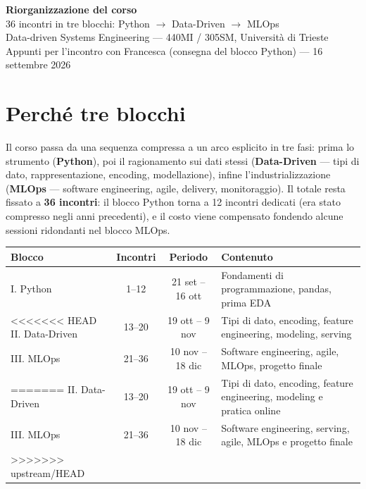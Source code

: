 \documentclass[11pt,a4paper]{article}
\begin{document}
\begin{center}
{\Huge\bfseries\color{courseblue} Riorganizzazione del corso}\\[4pt]
{\Large\color{coursegray} 36 incontri in tre blocchi: Python $\to$ Data-Driven $\to$ MLOps}\\[6pt]
{\small\color{coursegray} Data-driven Systems Engineering --- 440MI / 305SM, Università di Trieste}\\
{\small\color{coursegray} Appunti per l'incontro con Francesca (consegna del blocco Python) --- 16 settembre 2026}
\end{center}

\vspace{0.6em}

\section*{Perché tre blocchi}
Il corso passa da una sequenza compressa a un arco esplicito in tre fasi: prima lo strumento (\textbf{Python}), poi il ragionamento sui dati stessi (\textbf{Data-Driven} --- tipi di dato, rappresentazione, encoding, modellazione), infine l'industrializzazione (\textbf{MLOps} --- software engineering, agile, delivery, monitoraggio). Il totale resta fissato a \textbf{36 incontri}: il blocco Python torna a 12 incontri dedicati (era stato compresso negli anni precedenti), e il costo viene compensato fondendo alcune sessioni ridondanti nel blocco MLOps.

\vspace{0.3em}
\begin{center}
\begin{tabularx}{\textwidth}{@{}l c c X@{}}
\toprule
\textbf{Blocco} & \textbf{Incontri} & \textbf{Periodo} & \textbf{Contenuto} \\
\midrule
\rowcolor{tealsoft} I. Python & 1--12 & 21 set -- 16 ott & Fondamenti di programmazione, pandas, prima EDA \\
<<<<<<< HEAD
\rowcolor{courseice} II. Data-Driven & 13--20 & 19 ott -- 9 nov & Tipi di dato, encoding, feature engineering, modeling, serving \\
\rowcolor{plumsoft} III. MLOps & 21--36 & 10 nov -- 18 dic & Software engineering, agile, MLOps, progetto finale \\
=======
\rowcolor{courseice} II. Data-Driven & 13--20 & 19 ott -- 9 nov & Tipi di dato, encoding, feature engineering, modeling e pratica online \\
\rowcolor{plumsoft} III. MLOps & 21--36 & 10 nov -- 18 dic & Software engineering, serving, agile, MLOps e progetto finale \\
>>>>>>> upstream/HEAD
\bottomrule
\end{tabularx}
\end{center}
\end{document}
